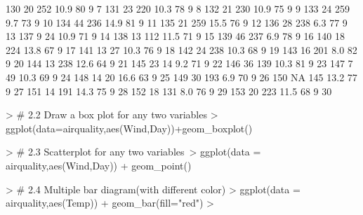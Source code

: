 \documentclass{article}
\begin{document}
\begin{Schunk}
\begin{Soutput}
130    20     252 10.9   80     9   7
131    23     220 10.3   78     9   8
132    21     230 10.9   75     9   9
133    24     259  9.7   73     9  10
134    44     236 14.9   81     9  11
135    21     259 15.5   76     9  12
136    28     238  6.3   77     9  13
137     9      24 10.9   71     9  14
138    13     112 11.5   71     9  15
139    46     237  6.9   78     9  16
140    18     224 13.8   67     9  17
141    13      27 10.3   76     9  18
142    24     238 10.3   68     9  19
143    16     201  8.0   82     9  20
144    13     238 12.6   64     9  21
145    23      14  9.2   71     9  22
146    36     139 10.3   81     9  23
147     7      49 10.3   69     9  24
148    14      20 16.6   63     9  25
149    30     193  6.9   70     9  26
150    NA     145 13.2   77     9  27
151    14     191 14.3   75     9  28
152    18     131  8.0   76     9  29
153    20     223 11.5   68     9  30
\end{Soutput}
\end{Schunk}

\begin{Schunk}
\begin{Sinput}
> # 2.2 Draw a box plot for any two variables
> ggplot(data=airquality,aes(Wind,Day))+geom_boxplot()
\end{Sinput}
\end{Schunk}

\begin{Schunk}
\begin{Sinput}
> # 2.3 Scatterplot for any two variables\
> ggplot(data = airquality,aes(Wind,Day)) + geom_point()
\end{Sinput}
\end{Schunk}

\begin{Schunk}
\begin{Sinput}
> # 2.4 Multiple bar diagram(with different color)
> ggplot(data = airquality,aes(Temp)) + geom_bar(fill="red")
> 
\end{Sinput}
\end{Schunk}
\newpage
\end{document}
